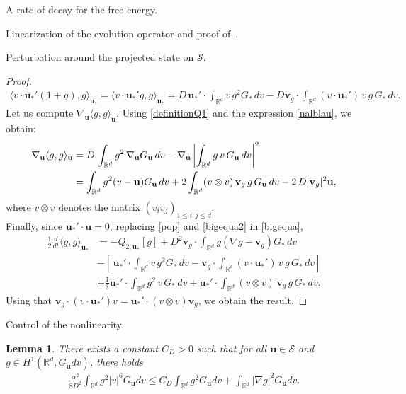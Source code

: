 \documentclass[reqno]{amsart} %
\newtheorem{lemma}{Lemma}[section]
\begin{document}
\begin{section}{A rate of decay for the free energy.}
\begin{section}{Linearization of the evolution operator and proof of~\texorpdfstring{}{thm3}.}
\begin{subsection}{Perturbation around the projected state on \texorpdfstring{$\mathcal{S}$}{S}.}
\begin{proof}
\begin{align}
\label{pop}
    \langle v\cdot \mathbf{u}_*'(1+g),g\rangle_{\mathbf{u}_*}=\langle v\cdot \mathbf{u}_*'g,g\rangle_{\mathbf{u}_*}=D\,\mathbf{u}_*' \cdot \int_{\mathbb{R}^d}v\,g^2G_{*}\,dv- D\mathbf{v}_g \cdot\int_{\mathbb{R}^d}(v\cdot \mathbf{u}_*')\,v\,g\,G_{*}\, dv.
\end{align}
Let us compute $\nabla_\mathbf{u}\langle g,g \rangle_\mathbf{u} $.
Using \eqref{definitionQ1} and the expression \eqref{nalblau}, we obtain:
\begin{align}
\label{bigequa2}
    \nabla_\mathbf{u}\langle g,g \rangle_\mathbf{u}&=D\,\int_{\mathbb{R}^d}g^2\,\nabla_\mathbf{u} G_\mathbf{u}\,dv- \nabla_\mathbf{u}\left| \notag \int_{\mathbb{R}^d}g\,v\,G_\mathbf{u}\,dv\right|^2\\&=\int_{\mathbb{R}^d}g^2(v-\mathbf{u})G_\mathbf{u}\,dv+2  \int_{\mathbb{R}^d}(v \otimes v)\, \mathbf{v}_g \,g\, G_\mathbf{u}\,dv-2\,D |\mathbf{v}_g|^2\mathbf{u},
\end{align}
where $v\otimes v$ denotes the matrix $(v_iv_j)_{1\leq i,j\leq d}$.\\
Finally,
since $\mathbf{u}_*'\cdot \mathbf{u}=0$, replacing \eqref{pop} and \eqref{bigequa2} in \eqref{bigequa},
\begin{align*}
    \frac{1}{2}\frac{d}{dt}\langle g,g\rangle_{\mathbf{u}_*}&=-Q_{2,\mathbf{u}_*}[g] + D^2 \mathbf{v}_g \cdot  \int_{\mathbb{R}^d}g(\nabla g- \mathbf{v}_g)G_{{*}}\,dv\\& - \left[\,\mathbf{u}_*' \cdot \int_{\mathbb{R}^d}v\,g^2G_{*}\,dv - \mathbf{v}_g \cdot\int_{\mathbb{R}^d}(v\cdot \mathbf{u}_*')\,v\,g\,G_{*}\,dv\right]  \\&+\frac{1}{2}  \mathbf{u}_*'\cdot \int_{\mathbb{R}^d}g^2\,v\,G_{*}\,dv +  \mathbf{u}_*'\cdot\int_{\mathbb{R}^d}(v\otimes v) \,\mathbf{v}_g\, g\, G_{*}\, dv.
\end{align*}
Using that $\mathbf{v}_g\cdot (v\cdot \mathbf{u}_*')v=\mathbf{u}_*'\cdot (v\otimes v)\mathbf{v}_g$, we obtain the result.
\end{proof}
\end{subsection}
\begin{subsection}{Control of the nonlinearity.}
    

\begin{lemma}
\label{lemmemom}
   There exists a constant $C_D>0$ such that for all $\mathbf{u} \in \mathcal{S}$ and $g \in H^1(\mathbb{R}^d, G_\mathbf{u}dv)$, there holds 
   \begin{align*}
       \frac{\alpha^2}{8D^2} \int_{\mathbb{R}^d}g^2|v|^6G_\mathbf{u}dv \leq C_D \int_{\mathbb{R}^d}g^2G_\mathbf{u}dv+ \int_{\mathbb{R}^d}|\nabla g|^2G_\mathbf{u}dv.
   \end{align*}
\end{lemma}


\end{subsection}
\end{section}
\end{section}
\end{document}
